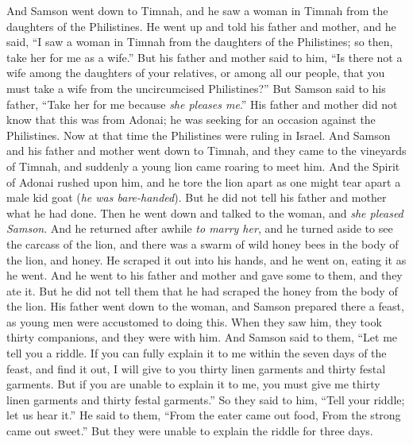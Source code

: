 \begin{biblechapter} %
 And Samson went down to Timnah, and he saw a woman in Timnah from the daughters of the Philistines.
\verse He went up and told his father and mother, and he said, “I saw a woman in Timnah from the daughters of the Philistines; so then, take her for me as a wife.”
\verse But his father and mother said to him, “Is there not a wife among the daughters of your relatives, or among all our people, that you must take a wife from the uncircumcised Philistines?” But Samson said to his father, “Take her for me because \textit{she pleases me}.”
\verse His father and mother did not know that this was from Adonai; he was seeking for an occasion against the Philistines. Now at that time the Philistines were ruling in Israel.
\verse And Samson and his father and mother went down to Timnah, and they came to the vineyards of Timnah, and suddenly a young lion came roaring to meet him.
\verse And the Spirit of Adonai rushed upon him, and he tore the lion apart as one might tear apart a male kid goat (\textit{he was bare-handed}). But he did not tell his father and mother what he had done.
\verse Then he went down and talked to the woman, and \textit{she pleased Samson}.
\verse And he returned after awhile \textit{to marry her}, and he turned aside to see the carcass of the lion, and there was a swarm of wild honey bees in the body of the lion, and honey.
\verse He scraped it out into his hands, and he went on, eating it as he went. And he went to his father and mother and gave some to them, and they ate it. But he did not tell them that he had scraped the honey from the body of the lion.
\verse His father went down to the woman, and Samson prepared there a feast, as young men were accustomed to doing this.
\verse When they saw him, they took thirty companions, and they were with him.
\verse And Samson said to them, “Let me tell you a riddle. If you can fully explain it to me within the seven days of the feast, and find it out, I will give to you thirty linen garments and thirty festal garments.
\verse But if you are unable to explain it to me, you must give me thirty linen garments and thirty festal garments.” So they said to him, “Tell your riddle; let us hear it.”
\verse He said to them, “From the eater came out food, 
From the strong came out sweet.” But they were unable to explain the riddle for three days.

\end{biblechapter}
